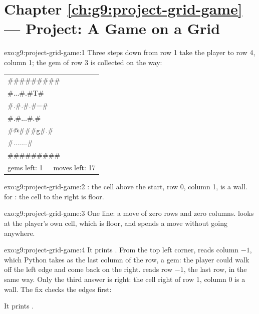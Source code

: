 \section*{Chapter \ref{ch:g9:project-grid-game} --- Project: A Game on a Grid}

\begin{solution}{exo:g9:project-grid-game:1}
Three steps down from row 1 take the player to row 4, column 1; the gem of row 3
is collected on the way:

\begin{center}
\ttfamily
\begin{tabular}{l}
\#\#\#\#\#\#\#\#\#\\
\#.{}.{}.{}\#.{}\#T\#\\
\#.{}\#.{}\#.{}\#=\#\\
\#.{}\#.{}.{}.{}\#.{}\#\\
\#@\#\#\#g\#.{}\#\\
\#.{}.{}.{}.{}.{}.{}.{}\#\\
\#\#\#\#\#\#\#\#\#\\
gems left: 1~~~moves left: 17
\end{tabular}
\end{center}
\end{solution}

\begin{solution}{exo:g9:project-grid-game:2}
: the cell above the start, row 0, column 1, is a wall. 
for : the cell to the right is floor.
\end{solution}

\begin{solution}{exo:g9:project-grid-game:3}
One line: a move of zero rows and zero columns.  looks at the
player's own cell, which is floor, and  spends a move without going
anywhere.

\label{lst:g9:project-grid-game:sol-wait}
\end{solution}

\begin{solution}{exo:g9:project-grid-game:4}
It prints . From the top left corner,  reads
column $-1$, which Python takes as the last column of the row, a gem: the
player could walk off the left edge and come back on the right.  reads
row $-1$, the last row, in the same way. Only the third answer is right: the
cell right of row 1, column 0 is a wall. The fix checks the edges first:

\label{lst:g9:project-grid-game:sol-wrap}

It prints .
\end{solution}


